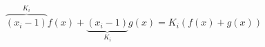 \documentclass{article} %
\begin{document}
\[ \overbrace{(x_i-1)}^{K_i}f(x)+\underbrace{(x_i-1)}_{K_i}g(x)
= K_i(f(x)+g(x)) \]
\end{document}
